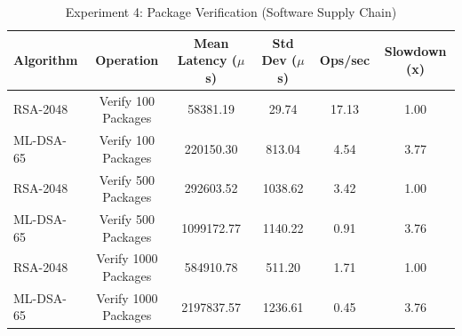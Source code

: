 \begin{table}
\caption{Experiment 4: Package Verification (Software Supply Chain)}
\label{tab:exp4}
\begin{tabular}{lccccc}
\toprule
Algorithm & Operation & Mean Latency ($\mu$s) & Std Dev ($\mu$s) & Ops/sec & Slowdown (x) \\
\midrule
RSA-2048 & Verify 100 Packages & 58381.19 & 29.74 & 17.13 & 1.00 \\
ML-DSA-65 & Verify 100 Packages & 220150.30 & 813.04 & 4.54 & 3.77 \\
RSA-2048 & Verify 500 Packages & 292603.52 & 1038.62 & 3.42 & 1.00 \\
ML-DSA-65 & Verify 500 Packages & 1099172.77 & 1140.22 & 0.91 & 3.76 \\
RSA-2048 & Verify 1000 Packages & 584910.78 & 511.20 & 1.71 & 1.00 \\
ML-DSA-65 & Verify 1000 Packages & 2197837.57 & 1236.61 & 0.45 & 3.76 \\
\bottomrule
\end{tabular}
\end{table}

